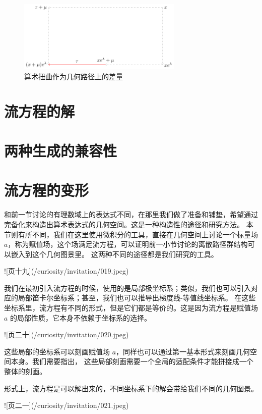 \documentclass[a4paper,12pt]{book}
\numberwithin{problem}{section}
\numberwithin{definition}{section}
\numberwithin{lemma}{section}
\numberwithin{proposition}{section}
\numberwithin{theorem}{section}
\numberwithin{grammar}{section}
\numberwithin{program}{section}
\numberwithin{convention}{section}
\numberwithin{corollary}{section}
\begin{document}
\begin{figure}[ht]
\centering
\includegraphics[width=0.7\textwidth]{../images/torsion}
\caption{算术扭曲作为几何路径上的差量}\label{fig:torsion}
\end{figure}

\section{流方程的解}

\section{两种生成的兼容性}

\section{流方程的变形}

和前一节讨论的有理数域上的表达式不同，在那里我们做了准备和铺垫，希望通过完备化来构造出算术表达式的几何空间。这是一种构造性的途径和研究方法。
本节则有所不同，我们在这里使用微积分的工具，直接在几何空间上讨论一个标量场$a$，称为赋值场，这个场满足流方程，可以证明前一小节讨论的离散路径群结构可以嵌入到这个几何图景里。
这两种不同的途径都是我们研究的工具。

![页十九](/curiosity/invitation/019.jpeg)

我们在最初引入流方程的时候，使用的是局部极坐标系；类似，我们也可以引入对应的局部笛卡尔坐标系；甚至，我们也可以推导出梯度线-等值线坐标系。
在这些坐标系里，流方程有不同的形式，但是它们都是等价的。这是因为流方程是赋值场 $a$ 的局部性质，它本身不依赖于坐标系的选择。

![页二十](/curiosity/invitation/020.jpeg)

这些局部的坐标系可以刻画赋值场 $a$，同样也可以通过第一基本形式来刻画几何空间本身。我们需要指出，
这些局部刻画需要一个全局的适配条件才能拼接成一个整体的刻画。

形式上，流方程是可以解出来的，不同坐标系下的解会带给我们不同的几何图景。

![页二一](/curiosity/invitation/021.jpeg)
\end{document}
